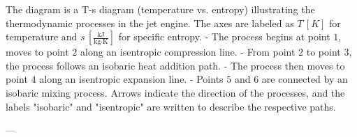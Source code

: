 The diagram is a T-s diagram (temperature vs. entropy) illustrating the thermodynamic processes in the jet engine. The axes are labeled as \( T \, [K] \) for temperature and \( s \, [\frac{\text{kJ}}{\text{kg} \cdot \text{K}}] \) for specific entropy.  
- The process begins at point \( 1 \), moves to point \( 2 \) along an isentropic compression line.  
- From point \( 2 \) to point \( 3 \), the process follows an isobaric heat addition path.  
- The process then moves to point \( 4 \) along an isentropic expansion line.  
- Points \( 5 \) and \( 6 \) are connected by an isobaric mixing process.  
Arrows indicate the direction of the processes, and the labels "isobaric" and "isentropic" are written to describe the respective paths.

---